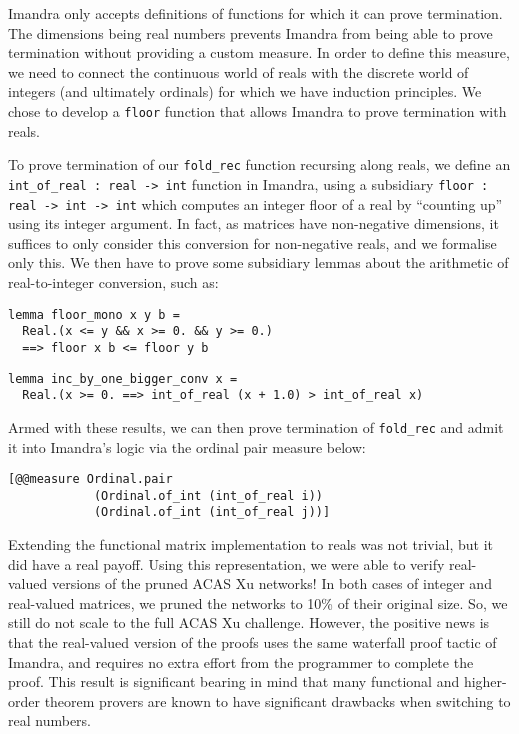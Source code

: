 \documentclass[runningheads]{llncs}
\begin{document}
\noindent Imandra only accepts definitions of functions for which it can prove termination. The dimensions being real numbers prevents Imandra from being able to prove termination without providing a custom measure. In order to define this measure, we need to connect the continuous world of reals with the discrete world of integers (and ultimately ordinals) for which we have induction principles. We chose to develop a \lstinline{floor} function that allows Imandra to prove termination with reals.

To prove termination of our \lstinline{fold_rec} function recursing along reals, we define an \lstinline{int_of_real : real -> int} function in Imandra, using a subsidiary \lstinline{floor : real -> int -> int} which computes an integer floor of a real by ``counting up'' using its integer argument. In fact, as matrices have non-negative dimensions, it suffices to only consider this conversion for non-negative reals, and we formalise only this. We then have to prove some subsidiary lemmas about the arithmetic of real-to-integer conversion, such as:
%
\begin{lstlisting}
lemma floor_mono x y b =
  Real.(x <= y && x >= 0. && y >= 0.)
  ==> floor x b <= floor y b
\end{lstlisting}

\begin{lstlisting}
lemma inc_by_one_bigger_conv x =
  Real.(x >= 0. ==> int_of_real (x + 1.0) > int_of_real x)
\end{lstlisting}

\noindent Armed with these results, we can then prove termination of \lstinline{fold_rec} and admit it into Imandra's logic via the ordinal pair measure below:
%
\begin{lstlisting}
[@@measure Ordinal.pair
            (Ordinal.of_int (int_of_real i))
            (Ordinal.of_int (int_of_real j))]
\end{lstlisting}

Extending the functional matrix implementation to reals was not trivial, but it did have a real payoff.
Using this representation, we were able to verify real-valued versions of the pruned ACAS Xu networks!
In both cases of integer and real-valued matrices, we pruned the networks to 10\% of their original size.
So, we still do not scale to the full ACAS Xu challenge.  However, the positive news is that the real-valued version
of the proofs
uses the same waterfall proof tactic of Imandra, and requires no extra effort from the programmer to complete the proof.
This result is significant bearing in mind that many functional and higher-order theorem provers are known to have significant drawbacks when switching to real numbers.
\end{document}
